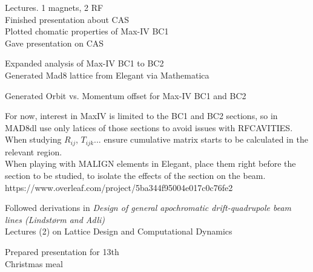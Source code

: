 Lectures. 1 magnets, 2 RF\\
Finished presentation about CAS\\

Plotted chomatic properties of Max-IV BC1\\
Gave presentation on CAS

Expanded analysis of Max-IV BC1 to BC2\\
Generated Mad8 lattice from Elegant via Mathematica

Generated Orbit vs. Momentum offset for Max-IV BC1 and BC2


For now, interest in MaxIV is limited to the BC1 and BC2 sections, so in MAD8dl use only latices of those sections to avoid issues with RFCAVITIES.\\
When studying $R_{ij}$, $T_{ijk}$... ensure cumulative matrix starts to be calculated in the relevant region.\\
When playing with MALIGN elements in Elegant, place them right before the section to be studied, to isolate the effects of the section on the beam.\\
https://www.overleaf.com/project/5ba344f95004e017c0c76fe2



Followed derivations in \textit{Design of general apochromatic drift-quadrupole beam lines (Lindst\o rm and Adli)} \\
Lectures (2) on Lattice Design and Computational Dynamics\\


Prepared presentation for 13th\\
Christmas meal\\




